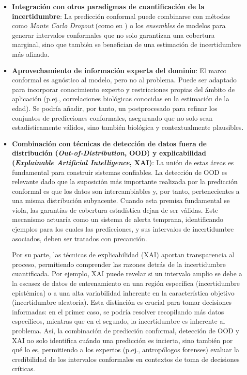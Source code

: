 \begin{itemize}

    \item \textbf{Integración con otros paradigmas de cuantificación de la incertidumbre}: La predicción conformal puede combinarse con métodos como \textit{Monte Carlo Dropout} (como en \cite{bethell2024}) o los \textit{ensembles} de modelos para generar intervalos conformales que no solo garantizan una cobertura marginal, sino que también se benefician de una estimación de incertidumbre más afinada. 

    \item \textbf{Aprovechamiento de información experta del dominio}: El marco conformal es agnóstico al modelo, pero no al problema. Puede ser adaptado para incorporar conocimiento experto y restricciones propias del ámbito de aplicación (p.ej., correlaciones biológicas conocidas en la estimación de la edad). 
    Se podría añadir, por tanto, un postprocesado para refinar los conjuntos de predicciones conformales,
    asegurando que no solo sean estadísticamente válidos, sino también biológica y contextualmente plausibles.
    
    \item \textbf{Combinación con técnicas de detección de datos fuera de distribución (\textit{Out-of-Distribution}, OOD) y explicabilidad (\textit{Explainable Artificial Intelligence}, XAI)}: La unión de estas áreas es fundamental para construir sistemas confiables. 
    La detección de OOD es relevante dado que la suposición más importante realizada por la predicción conformal es que los datos son intercambiables y, por tanto, pertenecientes a una misma distribución subyacente. Cuando esta premisa fundamental se viola, las garantías de cobertura estadística dejan de ser válidas. Este mecanismo actuaría como un sistema de alerta temprana, identificando ejemplos para los cuales las predicciones, y sus intervalos de incertidumbre asociados, deben ser tratados con precaución.
    
    Por su parte, las técnicas de explicabilidad (XAI) aportan transparencia al proceso, permitiendo comprender las razones detrás de la incertidumbre cuantificada. Por ejemplo, XAI puede revelar si un intervalo amplio se debe a la escasez de datos de entrenamiento en una región específica (incertidumbre epistémica) o a una alta variabilidad inherente en la característica objetivo (incertidumbre aleatoria). Esta distinción es crucial para tomar decisiones informadas: en el primer caso, se podría resolver recopilando más datos específicos, mientras que en el segundo, la incertidumbre es inherente al problema. Así, la combinación de predicción conformal, detección de OOD y XAI no solo identifica cuándo una predicción es incierta, sino también por qué lo es, permitiendo a los expertos (p.ej., antropólogos forenses) evaluar la credibilidad de los intervalos conformales en contextos de toma de decisiones críticas.

\end{itemize}

